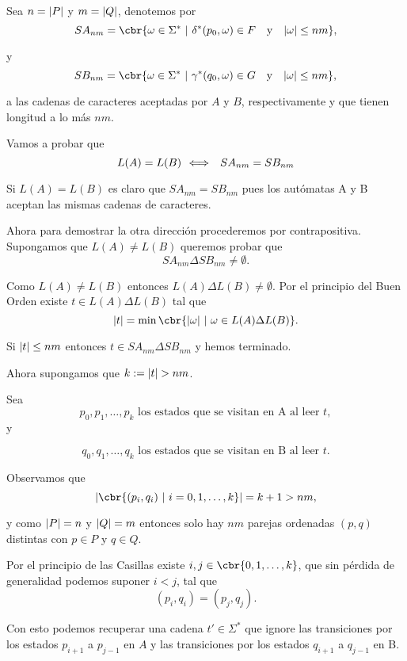 \documentclass{article}
\begin{document}
Sea $n=\lvert P\rvert$ y $m=\lvert Q\rvert$, denotemos por 
\[
    SA_{nm}=\cbr{\omega\in\Sigma^{\ast}\ |\ \delta^{\ast}(p_0,\omega)\in F\y \abs{\omega}\leq nm},
\]

y
\[
    SB_{nm}=\cbr{\omega\in\Sigma^{\ast}\ |\ \gamma^{\ast}(q_0,\omega)\in G\y \abs{\omega}\leq nm},
\]

a las cadenas de caracteres aceptadas por $A$ y $B$, respectivamente y que tienen longitud a lo más $nm$.

Vamos a probar  que 
\begin{equation}
    \label{equal LA and LB}
    L(A)=L(B)\mbox{$\ \ \Longleftrightarrow\ \ $ } SA_{nm}=SB_{nm}
\end{equation}

Si $L(A)=L(B)$ es claro que $SA_{nm}=SB_{nm}$ pues los autómatas A y B aceptan las mismas cadenas de caracteres.

Ahora para demostrar la otra dirección procederemos por contrapositiva. Supongamos que $L(A)\neq L(B)$ queremos probar que 
\[
    SA_{nm}\Delta SB_{nm}\neq \emptyset.
\]

Como $L(A)\neq L(B)$ entonces $L(A)\Delta L(B)\neq \emptyset$. Por el principio del Buen Orden existe $t\in L(A)\Delta L(B)$ tal que
\begin{equation}
    \label{minimum length}
    \abs{t}=\min\cbr{\abs{\omega}\ |\ \omega\in L(A)\Delta L(B)}.
\end{equation}

Si $\lvert t\rvert\leq nm$ entonces $t\in SA_{nm}\Delta SB_{nm}$ y hemos terminado. 

Ahora supongamos que $k:=\lvert t\rvert>nm$. 

Sea 
\[
    p_0,p_1,\dots,p_k\text{ los estados que se visitan en A al leer }t,
\]
y 

\[
    q_0,q_1,\dots,q_k\text{ los estados que se visitan en B al leer }t.
\]

Observamos que 
\[
  \abs{\cbr{(p_i,q_i)\ |\ i=0,1,\dots,k}}=k+1>nm,  
\]

y como $\lvert P\rvert=n$ y $\lvert Q\rvert=m$ entonces solo hay $nm$ parejas ordenadas $(p,q)$ distintas con $p\in P$ y $q\in Q$.

Por el principio de las Casillas existe $i,j\in \cbr{0,1,\dots,k}$, que sin pérdida de generalidad podemos suponer $i<j$, tal que 
\[
    (p_i,q_i)=(p_j,q_j).
\]

Con esto podemos recuperar una cadena $t'\in \Sigma^*$ que ignore las transiciones por los estados $p_{i+1}$ a $p_{j-1}$ en $A$ y las transiciones por los estados $q_{i+1}$ a $q_{j-1}$ en B.
\end{document}

